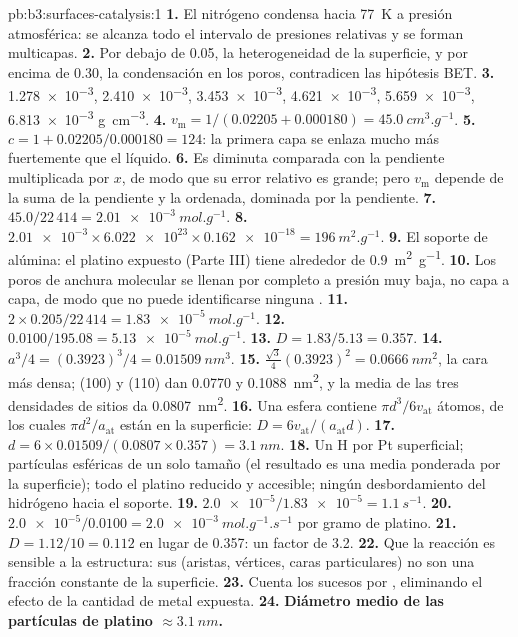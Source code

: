 \begin{solution}{pb:b3:surfaces-catalysis:1}
\textbf{1.} El nitrógeno condensa hacia \qty{77}{K} a presión atmosférica: se alcanza todo el intervalo de
presiones relativas y se forman multicapas.
\textbf{2.} Por debajo de 0.05, la heterogeneidad de la superficie, y por encima de 0.30, la condensación en los
poros, contradicen las hipótesis BET.
\textbf{3.} \num{1.278e-3}, \num{2.410e-3}, \num{3.453e-3}, \num{4.621e-3}, \num{5.659e-3}, \num{6.813e-3} \unit{g.cm^{-3}}.
\textbf{4.} $v_{\mathrm m} = 1/(0.02205 + 0.000180) = \qty{45.0}{cm^3.g^{-1}}$.
\textbf{5.} $c = 1 + 0.02205/0.000180 = 124$: la primera capa se enlaza mucho más fuertemente que
el líquido.
\textbf{6.} Es diminuta comparada con la pendiente multiplicada por $x$, de modo que su error relativo es grande;
pero $v_{\mathrm m}$ depende de la suma de la pendiente y la ordenada, dominada por la pendiente.
\textbf{7.} $45.0/22\,414 = \qty{2.01e-3}{mol.g^{-1}}$.
\textbf{8.} $\num{2.01e-3} \times \num{6.022e23} \times \num{0.162e-18} = \qty{196}{m^2.g^{-1}}$.
\textbf{9.} El soporte de alúmina: el platino expuesto (Parte III) tiene alrededor de \qty{0.9}{m^2.g^{-1}}.
\textbf{10.} Los poros de anchura molecular se llenan por completo a presión muy baja, no capa
a capa, de modo que no puede identificarse ninguna .
\textbf{11.} $2 \times 0.205/22\,414 = \qty{1.83e-5}{mol.g^{-1}}$.
\textbf{12.} $0.0100/195.08 = \qty{5.13e-5}{mol.g^{-1}}$.
\textbf{13.} $D = 1.83/5.13 = 0.357$.
\textbf{14.} $a^3/4 = (0.3923)^3/4 = \qty{0.01509}{nm^3}$.
\textbf{15.} $\frac{\sqrt3}{4}(0.3923)^2 = \qty{0.0666}{nm^2}$, la cara más densa; (100) y (110) dan 0.0770 y
\qty{0.1088}{nm^2}, y la media de las tres densidades de sitios da \qty{0.0807}{nm^2}.
\textbf{16.} Una esfera contiene $\pi d^3/6v_{\mathrm{at}}$ átomos, de los cuales $\pi d^2/a_{\mathrm{at}}$ están en la superficie:
$D = 6v_{\mathrm{at}}/(a_{\mathrm{at}}d)$.
\textbf{17.} $d = 6 \times 0.01509/(0.0807 \times 0.357) = \qty{3.1}{nm}$.
\textbf{18.} Un H por Pt superficial; partículas esféricas de un solo tamaño (el resultado es una
media ponderada por la superficie); todo el platino reducido y accesible; ningún desbordamiento
del hidrógeno hacia el soporte.
\textbf{19.} $\num{2.0e-5}/\num{1.83e-5} = \qty{1.1}{s^{-1}}$.
\textbf{20.} $\num{2.0e-5}/0.0100 = \qty{2.0e-3}{mol.g^{-1}.s^{-1}}$ por gramo de platino.
\textbf{21.} $D = 1.12/10 = 0.112$ en lugar de 0.357: un factor de 3.2.
\textbf{22.} Que la reacción es sensible a la estructura: sus  (aristas,
vértices, caras particulares) no son una fracción constante de la superficie.
\textbf{23.} Cuenta los sucesos por , eliminando el efecto de la cantidad de
metal expuesta.
\textbf{24.} \textbf{Diámetro medio de las partículas de platino $\approx \qty{3.1}{nm}$.}
\end{solution}
